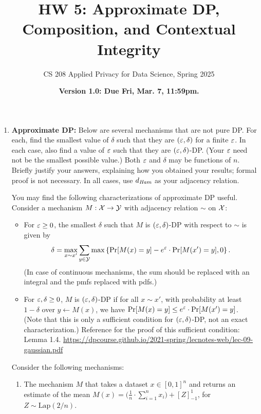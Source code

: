 \documentclass[11pt]{article}
\title{\vspace{-1.5cm} HW 5: Approximate DP, Composition, and Contextual Integrity}
\author{CS 208 Applied Privacy for Data Science, Spring 2025}
\date{\textbf{Version 1.0: Due Fri, Mar. 7, 11:59pm.}}
\begin{document}
\maketitle

\instructions

\begin{enumerate}[leftmargin=*]

\item \textbf{Approximate DP:}  
Below are several mechanisms that are not pure DP.  For each, find the smallest value of $\delta$ such that they are $(\varepsilon,\delta)$ for a finite $\varepsilon$.  In each case, also find a value of $\varepsilon$ such that they are $(\varepsilon,\delta)$-DP.  (Your $\varepsilon$ need not be the smallest possible value.)  Both $\varepsilon$ and $\delta$ may be functions of $n$.
Briefly justify your answers, explaining how you obtained your results; formal proof is not necessary.  In all cases, use $d_{\textit{Ham}}$ as your adjacency relation. 

You may find the following characterizations of approximate DP useful. Consider a mechanism $M : \mathcal{X}\rightarrow \mathcal{Y}$ with adjacency relation $\sim$ on $\mathcal{X}$:
\begin{itemize}
\item For $\varepsilon\geq 0$, the smallest $\delta$ such that $M$ is $(\varepsilon,\delta)$-DP with respect to $\sim$ is given by
$$\delta = \max_{x\sim x'} \sum_{y\in \mathcal{Y}} \max\left\{\Pr[M(x)=y]-e^\varepsilon\cdot \Pr[M(x')=y],0\right\}.$$
(In case of continuous mechanisms, the sum should be replaced with an integral and the pmfs replaced with pdfs.)

\item For $\varepsilon,\delta\geq 0$, $M$ is $(\varepsilon,\delta)$-DP if for all $x\sim x'$, with probability at least $1-\delta$ over $y\gets M(x)$, we have 
$\Pr[M(x)=y]\leq e^\varepsilon \cdot \Pr[M(x')=y]$.  (Note that this is only a sufficient condition for $(\varepsilon,\delta)$-DP, not an exact characterization.) Reference for the proof of this sufficient condition: Lemma 1.4. \url{https://dpcourse.github.io/2021-spring/lecnotes-web/lec-09-gaussian.pdf}
\end{itemize}


Consider the following mechanisms:

\begin{enumerate} %
    \item  The mechanism $M$ that takes a dataset $x\in [0,1]^n$ and returns an estimate of the mean $M(x) = \Big(\frac{1}{n}\cdot \sum_{i=1}^n x_i\Big)+ [Z]^1_{-1}$, for $Z\sim \mathrm{Lap}(2/n)$.


\end{enumerate}
\end{enumerate}
\end{document}
